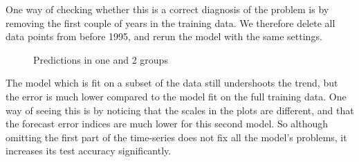 \documentclass{article}
\begin{document}
One way of checking whether this is a correct diagnosis of the problem is by removing the first couple of years in the training data. We therefore delete all data points from before 1995, and rerun the model with the same settings.


\begin{figure}[H]
    \centering
    \quad
    \quad
    \caption{Predictions in one and 2 groups}
\end{figure}

The model which is fit on a subset of the data still undershoots the trend, but the error is much lower compared to the model fit on the full training data. One way of seeing this is by noticing that the scales in the plots are different, and that the forecast error indices are much lower for this second model. So although omitting the first part of the time-series does not fix all the model’s problems, it increases its test accuracy significantly. 
\end{document}
